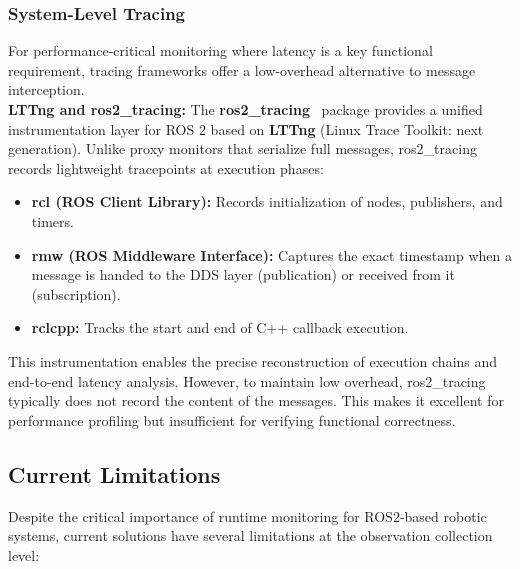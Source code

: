 \subsubsection{System-Level Tracing}

For performance-critical monitoring where latency is a key functional requirement, tracing frameworks offer a low-overhead alternative to message interception. \\

\textbf{LTTng and ros2\_tracing:} The \textbf{ros2\_tracing}~\cite{ros2tracing} package provides a unified instrumentation layer for ROS 2 based on \textbf{LTTng} (Linux Trace Toolkit: next generation). Unlike proxy monitors that serialize full messages, ros2\_tracing records lightweight tracepoints at execution phases:
\begin{itemize}[leftmargin=*]
    \item \textbf{rcl (ROS Client Library):} Records initialization of nodes, publishers, and timers.
    \item \textbf{rmw (ROS Middleware Interface):} Captures the exact timestamp when a message is handed to the DDS layer (publication) or received from it (subscription).
    \item \textbf{rclcpp:} Tracks the start and end of C++ callback execution.
\end{itemize}
This instrumentation enables the precise reconstruction of execution chains and end-to-end latency analysis. However, to maintain low overhead, ros2\_tracing typically does not record the content of the messages. This makes it excellent for performance profiling but insufficient for verifying functional correctness.

\subsection{Current Limitations}

Despite the critical importance of runtime monitoring for ROS2-based robotic systems, current solutions have several limitations at the observation collection level:

